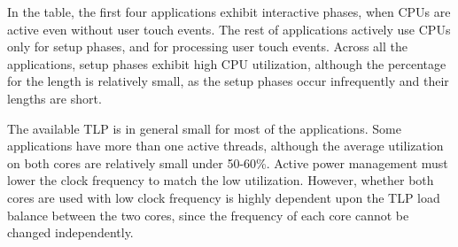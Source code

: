 In the table, the first four applications exhibit interactive phases, when CPUs are active
even without user touch events. 
The rest of applications actively use CPUs only for
setup phases, and for processing user touch events.
Across all the applications, setup phases exhibit high CPU utilization, although the percentage
for the length is relatively small, as the setup phases occur infrequently and their lengths are short.

The available TLP is in general small for most of the applications. 
Some applications have more than one active threads, although the average utilization on both cores are
relatively small under 50-60\%. Active power management must lower the clock frequency to match the
low utilization. However, whether both cores are used with low clock frequency is highly dependent upon
the TLP load balance between the two cores, since the frequency of each core cannot be changed independently.



